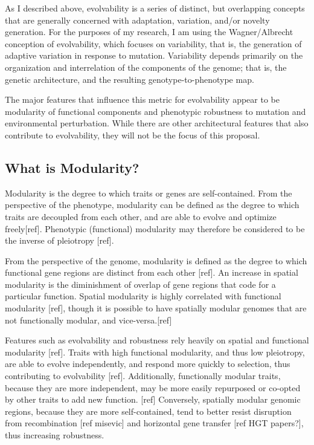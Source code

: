 As I described above, evolvability is a series of distinct, but overlapping concepts that are generally concerned with adaptation, variation, and/or novelty generation. For the purposes of my research, I am using the Wagner/Albrecht conception of evolvability, which focuses on variability, that is, the generation of adaptive variation in response to mutation. Variability depends primarily on the organization and interrelation of the components of the genome; that is, the genetic architecture, and the resulting genotype-to-phenotype map.

The major features that influence this metric for evolvability appear to be modularity of functional components and phenotypic robustness to mutation and environmental perturbation. While there are other architectural features that also contribute to evolvability, they will not be the focus of this proposal.

\subsection{What is Modularity?}

Modularity is the degree to which traits or genes are self-contained. From the perspective of the phenotype, modularity can be defined as the degree to which traits are decoupled from each other, and are able to evolve and optimize freely[ref]. Phenotypic (functional) modularity may therefore be considered to be the inverse of pleiotropy [ref].

From the perspective of the genome, modularity is defined as the degree to which functional gene regions are distinct from each other [ref]. An increase in spatial modularity is the diminishment of overlap of gene regions that code for a particular function. Spatial modularity is highly correlated with functional modularity [ref], though it is possible to have spatially modular genomes that are not functionally modular, and vice-versa.[ref]

Features such as evolvability and robustness rely heavily on spatial and functional modularity [ref]. Traits with high functional modularity, and thus low pleiotropy, are able to evolve independently, and respond more quickly to selection, thus contributing to evolvability [ref]. Additionally, functionally modular traits, because they are more independent, may be more easily repurposed or co-opted by other traits to add new function. [ref]  Conversely, spatially modular genomic regions, because they are more self-contained, tend to better resist disruption from recombination [ref misevic] and horizontal gene transfer [ref HGT papers?], thus increasing robustness.

